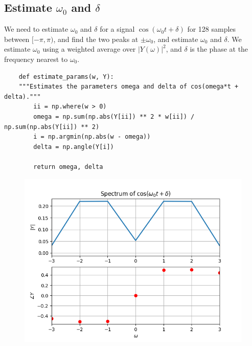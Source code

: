 \documentclass[12pt, a4paper]{article}
\begin{document}
\subsection{Estimate $\omega_0$ and $\delta$}\label{ssec:estimate}
We need to estimate $\omega_0$ and $\delta$ for a signal $\cos(\omega_0 t + \delta)$ for 128 samples between $[-\pi,\pi)$,
and find the two peaks at $\pm\omega_0$, and estimate $\omega_0$ and $\delta$. We estimate $\omega_0$ using a weighted average
over $|Y(\omega)|^2$, and $\delta$ is the phase at the frequency nearest to $\omega_0$.
\begin{lstlisting}
    def estimate_params(w, Y):
    """Estimates the parameters omega and delta of cos(omega*t + delta)."""
        ii = np.where(w > 0)
        omega = np.sum(np.abs(Y[ii]) ** 2 * w[ii]) / np.sum(np.abs(Y[ii]) ** 2)
        i = np.argmin(np.abs(w - omega))
        delta = np.angle(Y[i])
        
        return omega, delta
\end{lstlisting}
\begin{figure}[H]
    \centering
    \includegraphics[scale=0.7]{q3.png}
\end{figure}
\end{document}
